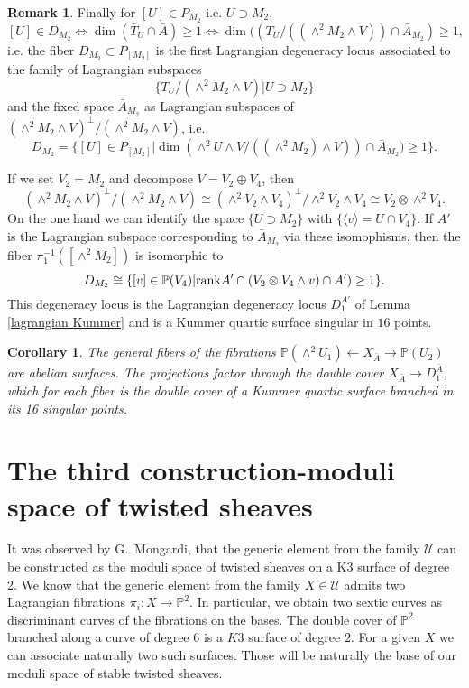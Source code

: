\documentclass[a4paper,11pt]{amsart}
\newtheorem{cor}[thm]{Corollary}
\theoremstyle{definition}
\newtheorem{rem}[thm]{Remark}
\numberwithin{equation}{section}
\numberwithin{equation}{section} \theoremstyle{definition}
\begin{document}
\begin{rem}
 
Finally for $[U]\in P_{M_2}$ i.e. $U\supset M_2$,
\[
[U]\in D_{M_2}\iff \dim(\bar{T}_U\cap \bar{A})\geq 1 \iff \dim((T_U/((\wedge^2 M_2\wedge V))\cap \bar{A}_{M_2})\geq 1,
\]
i.e. the fiber $D_{M_2}\subset  P_{[M_2]}$ is the first Lagrangian degeneracy locus associated to the family of Lagrangian subspaces 
\[
\{T_U/(\wedge^2 M_2\wedge V)|U\supset M_2\}
\]
and the fixed space $\bar{A}_{M_2}$ as Lagrangian subspaces of 
$(\wedge^2 M_2\wedge V)^{\perp}/(\wedge^2 M_2\wedge V)$, i.e.
\[
D_{M_2}=\{[U]\in P_{[M_2]} | \dim (\wedge^2U\wedge V/((\wedge^2 M_2) \wedge V))\cap \bar{A}_{M_2})\geq 1\} .
\]

If we set $V_2=M_2$ and decompose  $V=V_2\oplus V_4$, then 
\[
(\wedge^2 M_2\wedge V)^{\perp}/(\wedge^2 M_2\wedge V)\cong (\wedge^2 V_2\wedge V_4)^{\bot}/\wedge^2 V_2\wedge V_4\cong V_2\otimes \wedge^2V_4.
\]
On the one hand we can identify the space $\{U\supset M_2\}$ with $\{\langle v\rangle=U\cap V_4\}$.
If $A'$ is the Lagrangian subspace corresponding to $\bar{A}_{M_2}$ via these isomophisms, then the fiber $\pi_1^{-1}([\wedge^2M_2])$ is isomorphic to 
\[
D_{M_2}\cong\{[v]\in {{\mathbb{P}}}(V_4) | {\rm rank} A'\cap (V_2\otimes V_4\wedge v)\cap A')\geq 1\} .
\]
This degeneracy locus is the Lagrangian degeneracy locus $D_1^{A'}$ of Lemma \ref{lagrangian Kummer} and is a Kummer quartic surface singular in $16$ points.

\end{rem}
\begin{cor}The general fibers of the fibrations $\mathbb{P}(\wedge^2 U_1)\leftarrow X_{\bar{A}}\to \mathbb{P}(U_2)$ are abelian surfaces.  The projections factor 
through the double cover $X_{\bar{A}}\to D^{\bar{A}}_1$, which for each fiber is the double cover of a Kummer quartic surface branched in its 16 singular points. 
\end{cor}

\section{The third construction-moduli space of twisted sheaves}\label{known}
It was observed by G.~Mongardi, that the generic element from the family $\mathcal{U}$ can be constructed as the moduli space of twisted sheaves on a K3 surface of degree 2.
We know that the generic element from the family $X\in \mathcal{U}$ admits two Lagrangian fibrations $\pi_i\colon X\to {{\mathbb{P}}}^2$. 
In particular, we obtain two sextic curves as discriminant curves of the fibrations on the bases.
The double cover of ${{\mathbb{P}}}^2$ branched along a curve of degree $6$ is a $K3$ surface of degree $2$. For a given $X$ we can associate naturally two such surfaces. 
Those will be naturally the base of our moduli space of stable twisted sheaves.
\end{document}
